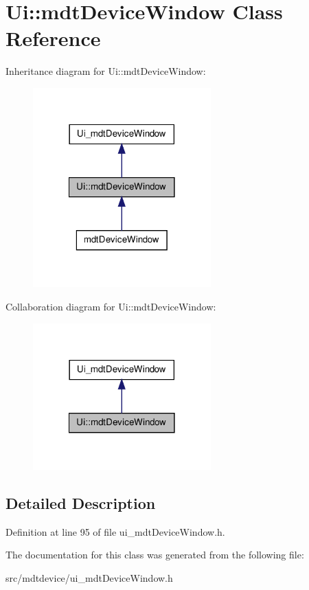 \hypertarget{class_ui_1_1mdt_device_window}{
\section{Ui::mdtDeviceWindow Class Reference}
\label{class_ui_1_1mdt_device_window}
}


Inheritance diagram for Ui::mdtDeviceWindow:\nopagebreak
\begin{figure}[H]
\begin{center}
\leavevmode
\includegraphics[width=194pt]{class_ui_1_1mdt_device_window__inherit__graph}
\end{center}
\end{figure}


Collaboration diagram for Ui::mdtDeviceWindow:\nopagebreak
\begin{figure}[H]
\begin{center}
\leavevmode
\includegraphics[width=194pt]{class_ui_1_1mdt_device_window__coll__graph}
\end{center}
\end{figure}


\subsection{Detailed Description}


Definition at line 95 of file ui\_\-mdtDeviceWindow.h.



The documentation for this class was generated from the following file:\begin{DoxyCompactItemize}
\item 
src/mdtdevice/ui\_\-mdtDeviceWindow.h\end{DoxyCompactItemize}
